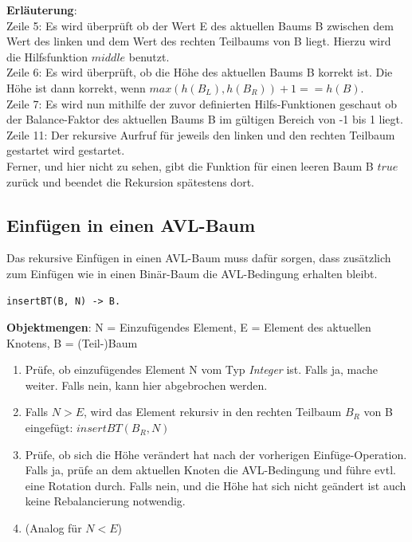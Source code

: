 \documentclass{article}
\begin{document}
	\textbf{Erläuterung}: \\
	Zeile 5: Es wird überprüft ob der Wert E des aktuellen Baums B zwischen dem Wert des linken und dem Wert des rechten Teilbaums von B liegt. Hierzu wird die Hilfsfunktion $middle$ benutzt.\\
	Zeile 6: Es wird überprüft, ob die Höhe des aktuellen Baums B korrekt ist. Die Höhe ist dann korrekt, wenn $max(h(B_L), h(B_R)) + 1 == h(B)$.\\
	Zeile 7: Es wird nun mithilfe der zuvor definierten Hilfs-Funktionen geschaut ob der Balance-Faktor des aktuellen Baums B im gültigen Bereich von -1 bis 1 liegt.\\
	Zeile 11: Der rekursive Aurfruf für jeweils den linken und den rechten Teilbaum gestartet wird gestartet.\\
	Ferner, und hier nicht zu sehen, gibt die Funktion für einen leeren Baum B $true$ zurück und beendet die Rekursion spätestens dort.
	
	\newpage
	
	\subsection{Einfügen in einen AVL-Baum}
	
	Das rekursive Einfügen in einen AVL-Baum muss dafür sorgen, dass zusätzlich zum Einfügen wie in einen Binär-Baum die AVL-Bedingung erhalten bleibt.

\begin{lstlisting}
insertBT(B, N) -> B.
\end{lstlisting}

	\textbf{Objektmengen}: N = Einzufügendes Element, E = Element des aktuellen Knotens, B = (Teil-)Baum
	
	\begin{enumerate}
		\item Prüfe, ob einzufügendes Element N vom Typ \textit{Integer} ist. Falls ja, mache weiter. Falls nein, kann hier abgebrochen werden.
		\item Falls $N > E$, wird das Element rekursiv in den rechten Teilbaum $B_R$ von B eingefügt: $insertBT(B_R, N)$
		\item Prüfe, ob sich die Höhe verändert hat nach der vorherigen Einfüge-Operation. Falls ja, prüfe an dem aktuellen Knoten die AVL-Bedingung und führe evtl. eine Rotation durch. Falls nein, und die Höhe hat sich nicht geändert ist auch keine Rebalancierung notwendig. 
		\item (Analog für $N < E$)
	\end{enumerate}
	
\end{document}
